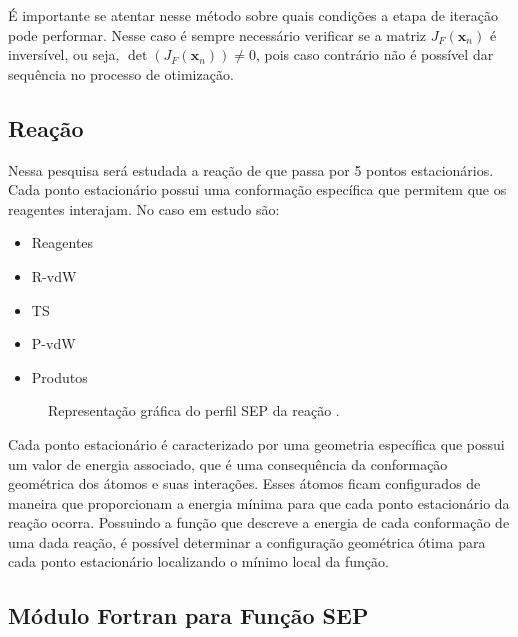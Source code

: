 É importante se atentar nesse método sobre quais condições a etapa de iteração pode performar. Nesse caso é sempre necessário verificar se a matriz $J_F(\mathbf{x}_n)$ é inversível, ou seja, $\det(J_F(\mathbf{x}_n)) \neq 0$, pois caso contrário não é possível dar sequência no processo de otimização.

\subsection{Reação }

Nessa pesquisa será estudada a reação de  que passa por 5 pontos estacionários. Cada ponto estacionário possui uma conformação específica que permitem que os reagentes interajam. No caso em estudo são:
%
\begin{itemize}
  \setlength\itemsep{0pt}
  \setlength\parsep{0pt}
  \item Reagentes
  \item R-vdW
  \item TS
  \item P-vdW
  \item Produtos
\end{itemize}

\begin{figure}
  \begin{center}
    
  \end{center}
  \caption{Representação gráfica do perfil SEP da reação .}
  \label{fig:perfil_sep_fh2o}
\end{figure}

Cada ponto estacionário é caracterizado por uma geometria específica que possui um valor de energia associado, que é uma consequência da conformação geométrica dos átomos e suas interações. Esses átomos ficam configurados de maneira que proporcionam a energia mínima para que cada ponto estacionário da reação ocorra. Possuindo a função que descreve a energia de cada conformação de uma dada reação, é possível determinar a configuração geométrica ótima para cada ponto estacionário localizando o mínimo local da função.

\subsection{Módulo Fortran para Função SEP}
\label{sec:module_pes}

